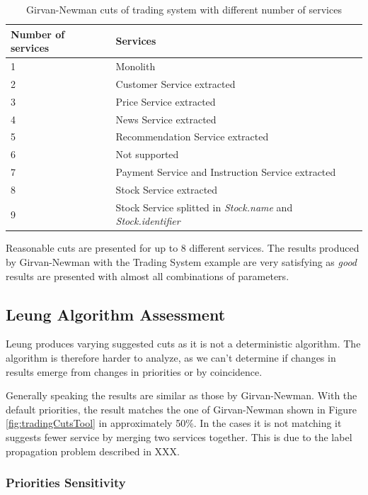 \begin{table}[H]
	\centering
	\caption{Girvan-Newman cuts of trading system with different number of services}
	\label{tab:tradingNumberOfServices}
	\begin{tabular}{|p{60pt}|p{200pt}|}
		\hline	
		\textbf{Number of services} & \textbf{Services}  \\
		\hline
		1 & Monolith \\
		\hline
		2 & Customer Service extracted \\
		\hline
		3 & Price Service extracted  \\
		\hline
		4 & News Service extracted  \\
		\hline
		5 & Recommendation Service extracted  \\
		\hline
		6 & Not supported\\
		\hline
		7 & Payment Service and Instruction Service extracted \\
		\hline
		8 & Stock Service extracted \\
		\hline
		9 & Stock Service splitted in \textit{Stock.name} and \textit{Stock.identifier} \\
		\hline
	\end{tabular}
\end{table}

Reasonable cuts are presented for up to 8 different services. The results produced by Girvan-Newman with the Trading System example are very satisfying as \textit{good} results are presented with almost all combinations of parameters. 

\subsection{Leung Algorithm Assessment}

Leung produces varying suggested cuts as it is not a deterministic algorithm. The algorithm is therefore harder to analyze, as we can't determine if changes in results emerge from changes in priorities or by  coincidence. 

Generally speaking the results are similar as those by Girvan-Newman. With the default priorities, the result matches the one of Girvan-Newman shown in Figure \ref{fig:tradingCutsTool} in approximately 50\%. In the cases it is not matching it suggests fewer service by merging two services together. This is due to the label propagation problem described in XXX.

\subsubsection{Priorities Sensitivity}

